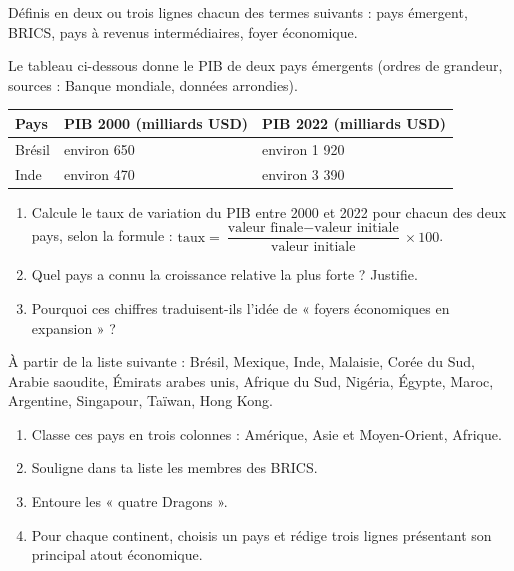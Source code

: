 \documentclass[11pt]{article}
\newcommand{\cle}[1]{{\popxbold\color{popdark}#1}}
\newcounter{popsec}
\newcounter{popsub}
\newcommand{\courssub}[1]{%
  \stepcounter{popsub}%
  \par\vspace{9pt}\noindent{\popxbold\fontsize{11.5}{13}\selectfont\color{popink}{\color{poporange}\thepopsec.\thepopsub}\hspace{6pt}#1}\par\nopagebreak\vspace{4pt}
}
\begin{document}
\begin{exercice}
Définis en deux ou trois lignes chacun des termes suivants : \cle{pays émergent}, \cle{BRICS}, \cle{pays à revenus intermédiaires}, \cle{foyer économique}.
\end{exercice}

\begin{exercice}
Le tableau ci-dessous donne le PIB de deux pays émergents (ordres de grandeur, sources : Banque mondiale, données arrondies).

\begin{center}
\begin{tabularx}{\linewidth}{|l|X|X|}\hline
\rowcolor{popblueL} \textbf{Pays} & \textbf{PIB 2000 (milliards USD)} & \textbf{PIB 2022 (milliards USD)} \\ \hline
Brésil & environ 650 & environ 1 920 \\ \hline
Inde & environ 470 & environ 3 390 \\ \hline
\end{tabularx}
\end{center}

\begin{enumerate}
\item Calcule le taux de variation du PIB entre 2000 et 2022 pour chacun des deux pays, selon la formule : $\text{taux} = \dfrac{\text{valeur finale} - \text{valeur initiale}}{\text{valeur initiale}} \times 100$.
\item Quel pays a connu la croissance relative la plus forte ? Justifie.
\item Pourquoi ces chiffres traduisent-ils l'idée de « foyers économiques en expansion » ?
\end{enumerate}
\end{exercice}

\courssub{Je m'entraîne}

\begin{exercice}
À partir de la liste suivante : Brésil, Mexique, Inde, Malaisie, Corée du Sud, Arabie saoudite, Émirats arabes unis, Afrique du Sud, Nigéria, Égypte, Maroc, Argentine, Singapour, Taïwan, Hong Kong.
\begin{enumerate}
\item Classe ces pays en trois colonnes : Amérique, Asie et Moyen-Orient, Afrique.
\item Souligne dans ta liste les membres des BRICS.
\item Entoure les « quatre Dragons ».
\item Pour chaque continent, choisis un pays et rédige trois lignes présentant son principal atout économique.
\end{enumerate}
\end{exercice}
\end{document}
